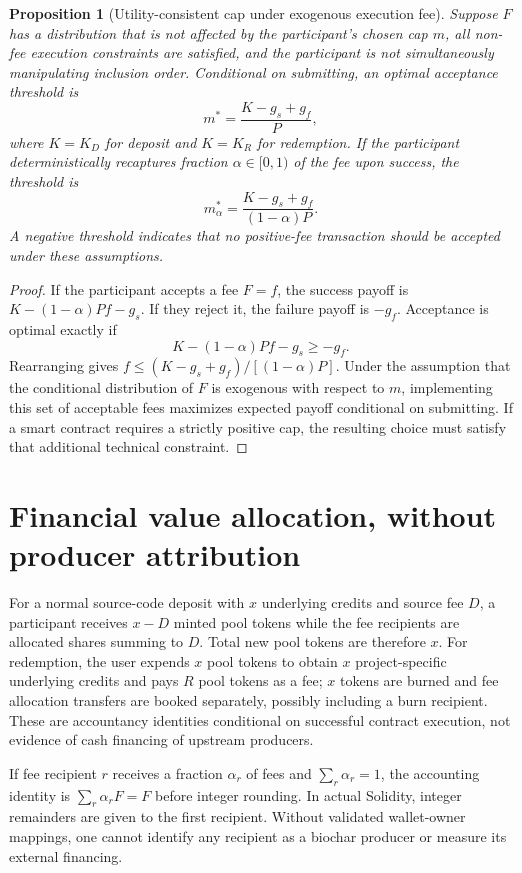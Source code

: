 \documentclass[11pt]{article}
\newtheorem{proposition}{Proposition}
\begin{document}
\begin{proposition}[Utility-consistent cap under exogenous execution fee]
Suppose $F$ has a distribution that is not affected by the participant's chosen cap $m$, all non-fee execution constraints are satisfied, and the participant is not simultaneously manipulating inclusion order. Conditional on submitting, an optimal acceptance threshold is
\[
m^*=\frac{K-g_s+g_f}{P},
\]
where $K=K_D$ for deposit and $K=K_R$ for redemption. If the participant deterministically recaptures fraction $\alpha\in[0,1)$ of the fee upon success, the threshold is
\[
m_\alpha^*=\frac{K-g_s+g_f}{(1-\alpha)P}.
\]
A negative threshold indicates that no positive-fee transaction should be accepted under these assumptions.
\end{proposition}
\begin{proof}
If the participant accepts a fee $F=f$, the success payoff is $K-(1-\alpha)Pf-g_s$. If they reject it, the failure payoff is $-g_f$. Acceptance is optimal exactly if
\[
K-(1-\alpha)Pf-g_s\geq -g_f.
\]
Rearranging gives $f\leq(K-g_s+g_f)/[(1-\alpha)P]$. Under the assumption that the conditional distribution of $F$ is exogenous with respect to $m$, implementing this set of acceptable fees maximizes expected payoff conditional on submitting. If a smart contract requires a strictly positive cap, the resulting choice must satisfy that additional technical constraint.
\end{proof}

\section{Financial value allocation, without producer attribution}
For a normal source-code deposit with $x$ underlying credits and source fee $D$, a participant receives $x-D$ minted pool tokens while the fee recipients are allocated shares summing to $D$. Total new pool tokens are therefore $x$. For redemption, the user expends $x$ pool tokens to obtain $x$ project-specific underlying credits and pays $R$ pool tokens as a fee; $x$ tokens are burned and fee allocation transfers are booked separately, possibly including a burn recipient. These are accountancy identities conditional on successful contract execution, not evidence of cash financing of upstream producers.

If fee recipient $r$ receives a fraction $\alpha_r$ of fees and $\sum_r\alpha_r=1$, the accounting identity is $\sum_r\alpha_rF=F$ before integer rounding. In actual Solidity, integer remainders are given to the first recipient. Without validated wallet-owner mappings, one cannot identify any recipient as a biochar producer or measure its external financing.
\end{document}
